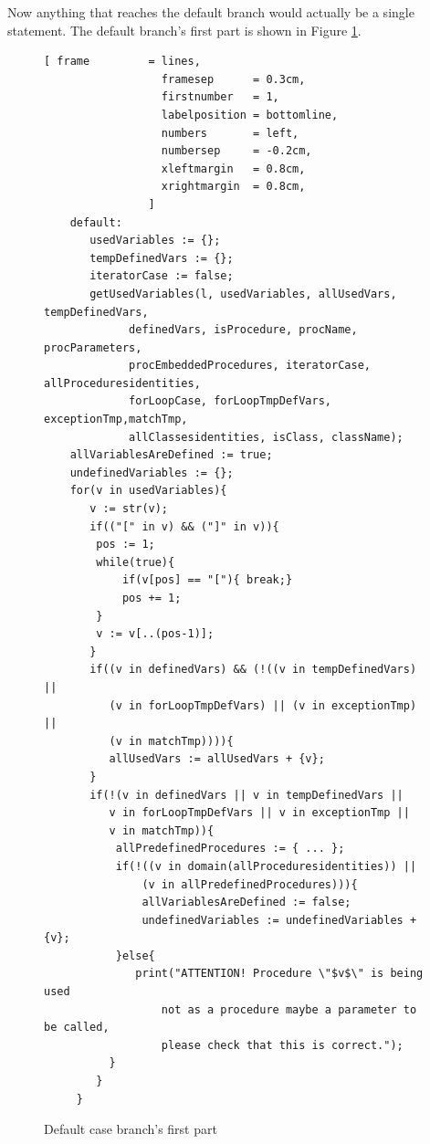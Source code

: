 \documentclass[11pt]{report}
\begin{document}
Now anything that reaches the default branch would actually be a single statement. The default branch's first part is shown in Figure \ref{fig:default case branch}.

\begin{figure}[!htb]
\centering
\begin{Verbatim}[ frame         = lines, 
                  framesep      = 0.3cm, 
                  firstnumber   = 1,
                  labelposition = bottomline,
                  numbers       = left,
                  numbersep     = -0.2cm,
                  xleftmargin   = 0.8cm,
                  xrightmargin  = 0.8cm,
                ]
    default:              
       usedVariables := {};
       tempDefinedVars := {};
       iteratorCase := false;
       getUsedVariables(l, usedVariables, allUsedVars, tempDefinedVars,
	         definedVars, isProcedure, procName, procParameters,
	         procEmbeddedProcedures, iteratorCase, allProceduresidentities, 
	         forLoopCase, forLoopTmpDefVars, exceptionTmp,matchTmp, 
	         allClassesidentities, isClass, className);
	allVariablesAreDefined := true;
	undefinedVariables := {};
	for(v in usedVariables){
	   v := str(v);
	   if(("[" in v) && ("]" in v)){
		pos := 1;
		while(true){
			if(v[pos] == "["){ break;}
			pos += 1;
		}
		v := v[..(pos-1)];
	   }
	   if((v in definedVars) && (!((v in tempDefinedVars) || 
	      (v in forLoopTmpDefVars) || (v in exceptionTmp) || 
	      (v in matchTmp)))){
		  allUsedVars := allUsedVars + {v};
	   }
	   if(!(v in definedVars || v in tempDefinedVars || 
	      v in forLoopTmpDefVars || v in exceptionTmp ||
	      v in matchTmp)){
		   allPredefinedProcedures := { ... };
		   if(!((v in domain(allProceduresidentities)) ||
		       (v in allPredefinedProcedures))){
			   allVariablesAreDefined := false;
			   undefinedVariables := undefinedVariables + {v};
		   }else{
			  print("ATTENTION! Procedure \"$v$\" is being used 
			      not as a procedure maybe a parameter to be called,
			      please check that this is correct.");
		  }
	    }
	 }
\end{Verbatim}
\vspace*{-0.5cm}
\caption{Default case branch's first part}
\label{fig:default case branch}
\end{figure}
\end{document}
